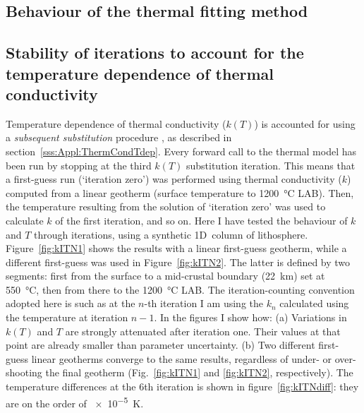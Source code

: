 \cleardoublepage
\begin{subappendices}
\section[Behaviour of the thermal fitting method]{Behaviour of the thermal fitting method}
\label{s:ApplSup:MethodTests}

\subsection{Stability of iterations to account for the temperature dependence of thermal conductivity}
\label{ss:ApplSup:MethodTests:ItStab}

Temperature dependence of thermal conductivity ($k(T)$) is accounted for using a \textit{subsequent substitution} procedure \parencite[``Picard's method'', see e.g. ][]{Hauck1999}, as described in section~\ref{sss:Appl:ThermCondTdep}.
Every forward call to the thermal model has been run by stopping at the third $k(T)$ substitution iteration.
This means that a first-guess run (`iteration zero') was performed using thermal conductivity ($k$) computed from a linear geotherm (surface temperature to \SI{1200}{\celsius} LAB).
Then, the temperature resulting from the solution of `iteration zero' was used to calculate $k$ of the first iteration, and so on.
Here I have tested the behaviour of $k$ and $T$ through iterations, using a synthetic 1D~column of lithosphere.
Figure~\ref{fig:kITN1} shows the results with a linear first-guess geotherm, while a different first-guess was used in Figure~\ref{fig:kITN2}.
The latter is defined by two segments: first from the surface to a mid-crustal boundary (22~\si{\kilo \metre}) set at \SI{550}{\celsius}, then from there to the \SI{1200}{\celsius} LAB.
The iteration-counting convention adopted here is such as at the $n$-th iteration I am using the $k_n$ calculated using the temperature at iteration $n-1$.
In the figures I show how:
(a) Variations in $k(T)$ and $T$ are strongly attenuated after iteration one. Their values at that point are already smaller than parameter uncertainty.
(b) Two different first-guess linear geotherms converge to the same results, regardless of under- or over-shooting the final geotherm (Fig.~\ref{fig:kITN1} and \ref{fig:kITN2}, respectively). The temperature differences at the 6th iteration is shown in figure~\ref{fig:kITNdiff}: they are on the order of \SI{e-5}{\kelvin}.


\end{subappendices}
